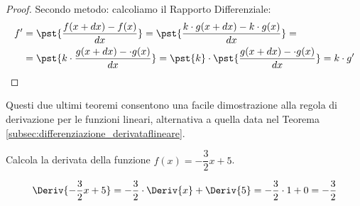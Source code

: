 \begin{proof}
Secondo metodo: calcoliamo il Rapporto Differenziale:
\begin{align*}
f' &= \pst{\frac{f(x +dx) - f(x)}{dx}} = 
      \pst{\frac{k \cdot g(x +dx) - k \cdot g(x)}{dx}} = \\
   &= \pst{k \cdot \frac{g(x +dx) - \cdot g(x)}{dx}} = 
      \pst{k} \cdot \pst{\frac{g(x +dx) - \cdot g(x)}{dx}} = 
      k \cdot g'
\end{align*}
\end{proof}

\begin{osservazione}
Questi due ultimi teoremi consentono una facile dimostrazione alla regola di 
derivazione per le funzioni lineari, alternativa a quella data nel Teorema 
\ref{subsec:differenziazione_derivataflineare}.
\end{osservazione}

\begin{esempio}
\label{esem:diff_prodottocostante}
Calcola la derivata della funzione \(f(x)=-\dfrac{3}{2}x+5\).

\[\Deriv{-\dfrac{3}{2}x+5} = 
  -\dfrac{3}{2} \cdot \Deriv{x} + \Deriv{5} = 
  -\dfrac{3}{2} \cdot 1 + 0 = -\dfrac{3}{2}\]
\end{esempio}



